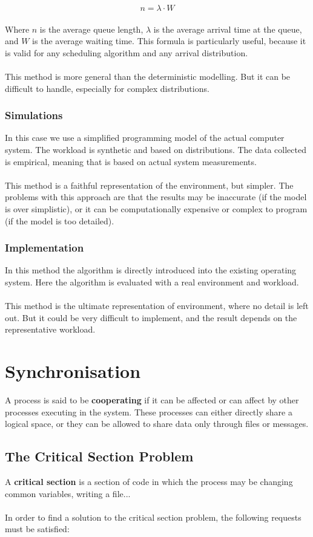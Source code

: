 \documentclass{article}
\begin{document}
\[ n = \lambda \cdot W \] \\
Where $n$ is the average queue length, $\lambda$ is the average arrival time at the queue, and $W$ is the average waiting time. This formula is particularly useful, because it is valid for any scheduling algorithm and any arrival distribution. \\ \\
This method is more general than the deterministic modelling. But it can be difficult to handle, especially for complex distributions.

\subsubsection{Simulations}
In this case we use a simplified programming model of the actual computer system. The workload is synthetic and based on distributions. The data collected is empirical, meaning that is based on actual system measurements. \\ \\
This method is a faithful representation of the environment, but simpler. The problems with this approach are that the results may be inaccurate (if the model is over simplistic), or it can be computationally expensive or complex to program (if the model is too detailed).

\subsubsection{Implementation}
In this method the algorithm is directly introduced into the existing operating system. Here the algorithm is evaluated with a real environment and workload. \\ \\
This method is the ultimate representation of environment, where no detail is left out. But it could be very difficult to implement, and the result depends on the representative workload.

\section{Synchronisation}
A process is said to be \textbf{cooperating} if it can be affected or can affect by other processes executing in the system. These processes can either directly share a logical space, or they can be allowed to share data only through files or messages.

\subsection{The Critical Section Problem}
A \textbf{critical section} is a section of code in which the process may be changing common variables, writing a file... \\ \\
In order to find a solution to the critical section problem, the following requests must be satisfied:
\end{document}
